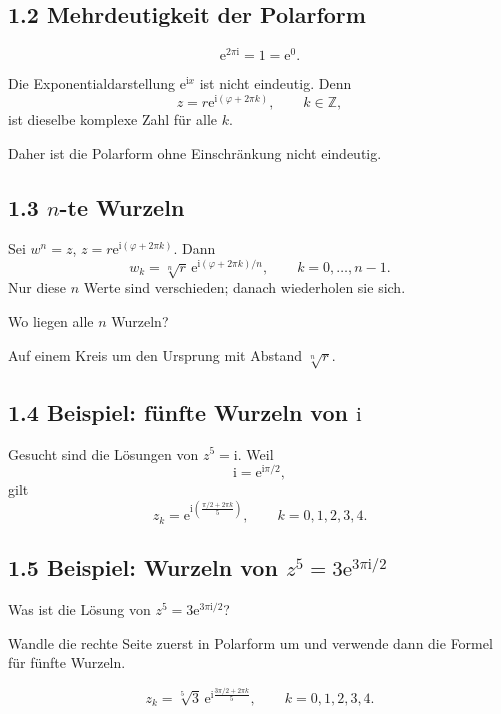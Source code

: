 \documentclass[11pt,a4paper]{article}
\newcommand{\Z}{\mathbb Z}
\newcommand{\ii}{\mathrm i}
\newcommand{\ee}{\mathrm e}
\begin{document}
\subsection{1.2 Mehrdeutigkeit der Polarform}
\[
\ee^{2\pi\ii}=1=\ee^{0}.
\]
\begin{importantbox}
Die Exponentialdarstellung $\ee^{\ii x}$ ist nicht eindeutig. Denn
\[
 z=r\ee^{\ii(\varphi+2\pi k)},\qquad k\in\Z,
\]
ist dieselbe komplexe Zahl für alle $k$.
\end{importantbox}
Daher ist die Polarform ohne Einschränkung nicht eindeutig.

\subsection{1.3 $n$-te Wurzeln}
Sei $w^n=z$, $z=r\ee^{\ii(\varphi+2\pi k)}$. Dann
\[
w_k=\sqrt[n]{r}\,\ee^{\ii(\varphi+2\pi k)/n},\qquad k=0,\ldots,n-1.
\]
Nur diese $n$ Werte sind verschieden; danach wiederholen sie sich.

\begin{fragebox}
Wo liegen alle $n$ Wurzeln?
\end{fragebox}
\begin{antwortbox}
Auf einem Kreis um den Ursprung mit Abstand $\sqrt[n]{r}$.
\end{antwortbox}

\subsection{1.4 Beispiel: fünfte Wurzeln von $\ii$}
\begin{beispielbox}
Gesucht sind die Lösungen von $z^5=\ii$. Weil
\[
\ii=\ee^{\ii\pi/2},
\]
gilt
\[
z_k=\ee^{\ii\left(\frac{\pi/2+2\pi k}{5}\right)},\qquad k=0,1,2,3,4.
\]
\end{beispielbox}

\subsection{1.5 Beispiel: Wurzeln von $z^5=3\ee^{3\pi\ii/2}$}
\begin{fragebox}
Was ist die Lösung von $z^5=3\ee^{3\pi\ii/2}$?
\end{fragebox}
\begin{tippbox}
Wandle die rechte Seite zuerst in Polarform um und verwende dann die Formel für fünfte Wurzeln.
\end{tippbox}
\begin{antwortbox}
\[
z_k=\sqrt[5]{3}\,\ee^{\ii\frac{3\pi/2+2\pi k}{5}},\qquad k=0,1,2,3,4.
\]
\end{antwortbox}
\end{document}
